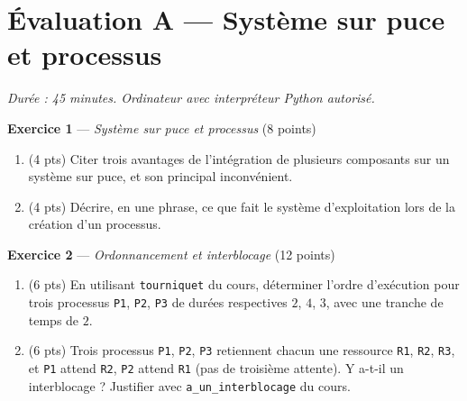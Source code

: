 \section*{Évaluation A --- Système sur puce et processus}
\textit{Durée : 45 minutes. Ordinateur avec interpréteur Python autorisé.}


\bigskip

\textbf{Exercice 1} --- \textit{Système sur puce et processus} \hfill (8 points)

\begin{enumerate}
  \item (4 pts) Citer trois avantages de l'intégration de plusieurs composants sur un système sur puce, et son principal inconvénient.
  \item (4 pts) Décrire, en une phrase, ce que fait le système d'exploitation lors de la création d'un processus.
\end{enumerate}

\bigskip

\textbf{Exercice 2} --- \textit{Ordonnancement et interblocage} \hfill (12 points)

\begin{enumerate}
  \item (6 pts) En utilisant \lstinline{tourniquet} du cours, déterminer l'ordre d'exécution pour trois processus \texttt{P1}, \texttt{P2}, \texttt{P3} de durées respectives $2$, $4$, $3$, avec une tranche de temps de $2$.
  \item (6 pts) Trois processus \texttt{P1}, \texttt{P2}, \texttt{P3} retiennent chacun une ressource \texttt{R1}, \texttt{R2}, \texttt{R3}, et \texttt{P1} attend \texttt{R2}, \texttt{P2} attend \texttt{R1} (pas de troisième attente). Y a-t-il un interblocage ? Justifier avec \lstinline{a_un_interblocage} du cours.
\end{enumerate}

